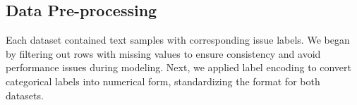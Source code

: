 \documentclass[runningheads]{llncs}
\begin{document}


\subsection{Data Pre-processing}
Each dataset contained text samples with corresponding issue labels. We began by filtering out rows with missing values to ensure consistency and avoid performance issues during modeling. Next, we applied label encoding to convert categorical labels into numerical form, standardizing the format for both datasets.
\end{document}

